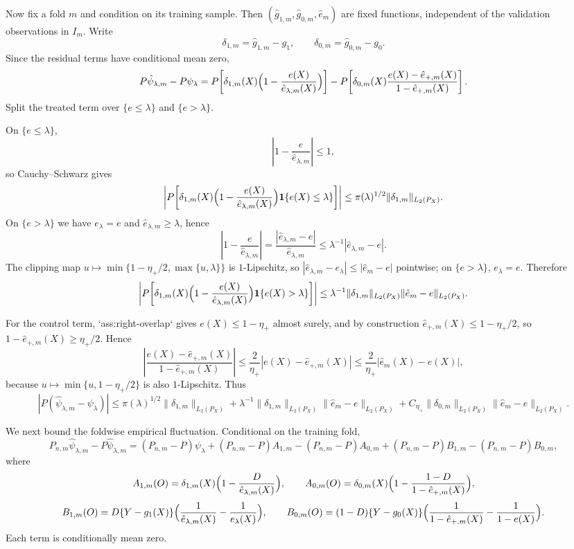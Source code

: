 \documentclass{article}
\begin{document}
Now fix a fold $m$ and condition on its training sample. Then $(\hat g_{1,m},\hat g_{0,m},\hat e_m)$ are fixed functions, independent of the validation observations in $I_m$. Write
\[
\delta_{1,m}=\hat g_{1,m}-g_1,\qquad \delta_{0,m}=\hat g_{0,m}-g_0.
\]
Since the residual terms have conditional mean zero,
\[
P\hat\psi_{\lambda,m}-P\psi_\lambda
=P\!\left[\delta_{1,m}(X)\Bigl(1-\frac{e(X)}{\hat e_{\lambda,m}(X)}\Bigr)\right]
-P\!\left[\delta_{0,m}(X)\frac{e(X)-\hat e_{+,m}(X)}{1-\hat e_{+,m}(X)}\right].
\]
Split the treated term over $\{e\le \lambda\}$ and $\{e>\lambda\}$.

On $\{e\le\lambda\}$,
\[
\left|1-\frac{e}{\hat e_{\lambda,m}}\right|\le 1,
\]
so Cauchy--Schwarz gives
\[
\left|P\!\left[\delta_{1,m}(X)\Bigl(1-\frac{e(X)}{\hat e_{\lambda,m}(X)}\Bigr)\mathbf 1\{e(X)\le\lambda\}\right]\right|
\le \pi(\lambda)^{1/2}\|\delta_{1,m}\|_{L_2(P_X)}.
\]
On $\{e>\lambda\}$ we have $e_\lambda=e$ and $\hat e_{\lambda,m}\ge\lambda$, hence
\[
\left|1-\frac{e}{\hat e_{\lambda,m}}\right|
=\frac{|\hat e_{\lambda,m}-e|}{\hat e_{\lambda,m}}
\le \lambda^{-1}|\hat e_{\lambda,m}-e|.
\]
The clipping map $u\mapsto \min\{1-\eta_+/2,\max\{u,\lambda\}\}$ is $1$-Lipschitz, so $|\hat e_{\lambda,m}-e_\lambda|\le |\hat e_m-e|$ pointwise; on $\{e>\lambda\}$, $e_\lambda=e$. Therefore
\[
\left|P\!\left[\delta_{1,m}(X)\Bigl(1-\frac{e(X)}{\hat e_{\lambda,m}(X)}\Bigr)\mathbf 1\{e(X)>\lambda\}\right]\right|
\le \lambda^{-1}\|\delta_{1,m}\|_{L_2(P_X)}\|\hat e_m-e\|_{L_2(P_X)}.
\]

For the control term, `ass:right-overlap` gives $e(X)\le 1-\eta_+$ almost surely, and by construction $\hat e_{+,m}(X)\le 1-\eta_+/2$, so $1-\hat e_{+,m}(X)\ge \eta_+/2$. Hence
\[
\left|\frac{e(X)-\hat e_{+,m}(X)}{1-\hat e_{+,m}(X)}\right|
\le \frac{2}{\eta_+}|e(X)-\hat e_{+,m}(X)|
\le \frac{2}{\eta_+}|\hat e_m(X)-e(X)|,
\]
because $u\mapsto \min\{u,1-\eta_+/2\}$ is also $1$-Lipschitz. Thus
\[
|P(\hat\psi_{\lambda,m}-\psi_\lambda)|
\le \pi(\lambda)^{1/2}\|\delta_{1,m}\|_{L_2(P_X)}
+\lambda^{-1}\|\delta_{1,m}\|_{L_2(P_X)}\|\hat e_m-e\|_{L_2(P_X)}
+C_{\eta_+}\|\delta_{0,m}\|_{L_2(P_X)}\|\hat e_m-e\|_{L_2(P_X)}.
\]

We next bound the foldwise empirical fluctuation. Conditional on the training fold,
\[
P_{n,m}\hat\psi_{\lambda,m}-P\hat\psi_{\lambda,m}
=(P_{n,m}-P)\psi_\lambda
+(P_{n,m}-P)A_{1,m}
-(P_{n,m}-P)A_{0,m}
+(P_{n,m}-P)B_{1,m}
-(P_{n,m}-P)B_{0,m},
\]
where
\[
A_{1,m}(O)=\delta_{1,m}(X)\Bigl(1-\frac{D}{\hat e_{\lambda,m}(X)}\Bigr),\qquad
A_{0,m}(O)=\delta_{0,m}(X)\Bigl(1-\frac{1-D}{1-\hat e_{+,m}(X)}\Bigr),
\]
\[
B_{1,m}(O)=D\{Y-g_1(X)\}\Bigl(\frac1{\hat e_{\lambda,m}(X)}-\frac1{e_\lambda(X)}\Bigr),
\qquad
B_{0,m}(O)=(1-D)\{Y-g_0(X)\}\Bigl(\frac1{1-\hat e_{+,m}(X)}-\frac1{1-e(X)}\Bigr).
\]
Each term is conditionally mean zero.
\end{document}
